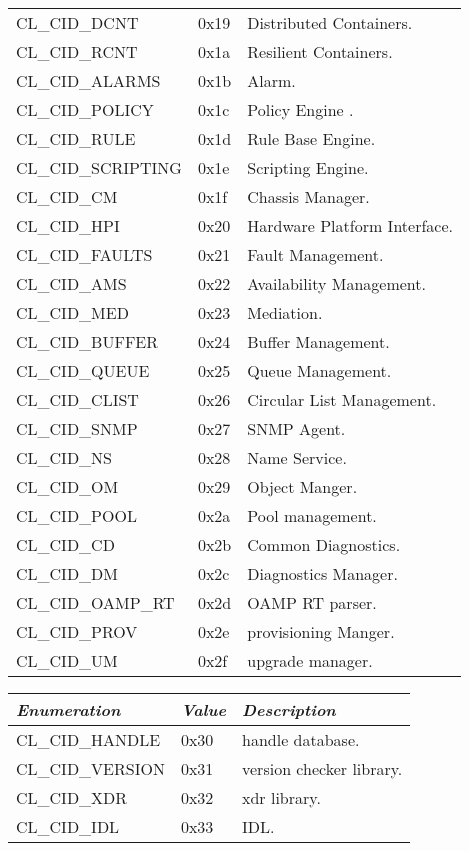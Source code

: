 \begin{tabular}{|p{2in}|p{1in}|p{2in}|}
CL\_\-CID\_\-DCNT &0x19 &Distributed Containers.\\
CL\_\-CID\_\-RCNT &0x1a &Resilient Containers.\\
CL\_\-CID\_\-ALARMS &0x1b &Alarm.\\
CL\_\-CID\_\-POLICY &0x1c &Policy Engine .\\
CL\_\-CID\_\-RULE &0x1d &Rule Base Engine.\\
CL\_\-CID\_\-SCRIPTING &0x1e &Scripting Engine.\\
CL\_\-CID\_\-CM &0x1f &Chassis Manager.\\
CL\_\-CID\_\-HPI &0x20 &Hardware Platform Interface.\\
CL\_\-CID\_\-FAULTS &0x21 &Fault Management.\\
CL\_\-CID\_\-AMS &0x22 &Availability Management.\\
CL\_\-CID\_\-MED &0x23 &Mediation.\\
CL\_\-CID\_\-BUFFER &0x24 &Buffer Management.\\
CL\_\-CID\_\-QUEUE &0x25 &Queue Management.\\
CL\_\-CID\_\-CLIST &0x26 &Circular List Management.\\
CL\_\-CID\_\-SNMP &0x27 &SNMP Agent.\\
CL\_\-CID\_\-NS &0x28 &Name Service.\\
CL\_\-CID\_\-OM &0x29 &Object Manger.\\
CL\_\-CID\_\-POOL &0x2a &Pool management.\\
CL\_\-CID\_\-CD &0x2b &Common Diagnostics.\\
CL\_\-CID\_\-DM &0x2c &Diagnostics Manager.\\
CL\_\-CID\_\-OAMP\_\-RT &0x2d &OAMP RT parser.\\
CL\_\-CID\_\-PROV &0x2e &provisioning Manger.\\
CL\_\-CID\_\-UM &0x2f &upgrade manager.\\\hline
\end{tabular}



\begin{tabular}{|p{2in}|p{1in}|p{2in}|} \hline
\textbf{\textit{Enumeration}} &\textbf{\textit{Value}} &\textbf{\textit{Description}} \\\hline

CL\_\-CID\_\-HANDLE &0x30 &handle database.\\
CL\_\-CID\_\-VERSION &0x31 &version checker library.\\
CL\_\-CID\_\-XDR &0x32 &xdr library.\\
CL\_\-CID\_\-IDL &0x33 &IDL.\\\hline
\end{tabular}
\newpage


